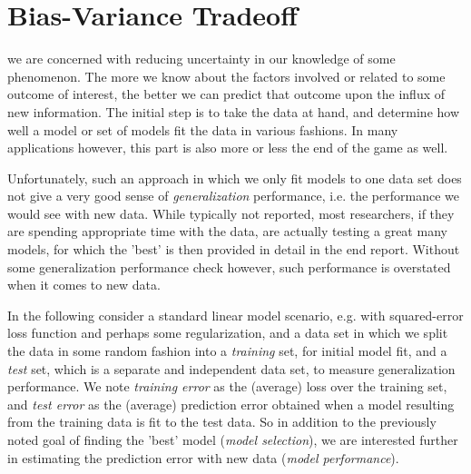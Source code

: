 \documentclass[english,nohyper,titlepage]{tufte-handout}
\begin{document}
\part{Bias-Variance Tradeoff}
 we are concerned with reducing uncertainty in our knowledge of some phenomenon.  The more we know about the factors involved or related to some outcome of interest, the better we can predict that outcome upon the influx of new information.  The initial step is to take the data at hand, and determine how well a model or set of models fit the data in various fashions.  In many applications however, this part is also more or less the end of the game as well.

Unfortunately, such an approach in which we only fit models to one data set does not give a very good sense of \emph{generalization} performance, i.e. the performance we would see with new data.  While typically not reported, most researchers, if they are spending appropriate time with the data, are actually testing a great many models, for which the 'best' is then provided in detail in the end report.  Without some generalization performance check however, such performance is overstated when it comes to new data.

In the following consider a standard linear model scenario, e.g. with squared-error loss function and perhaps some regularization, and a data set in which we split the data in some random fashion into a \emph{training} set, for initial model fit, and a \emph{test} set, which is a separate and independent data set, to measure generalization performance.  We note \emph{training error} as the (average) loss over the training set, and \emph{test error} as the (average) prediction error obtained when a model resulting from the training data is fit to the test data.  So in addition to the previously noted goal of finding the 'best' model (\emph{model selection}), we are interested further in estimating the prediction error with new data (\emph{model performance}).
\end{document}
